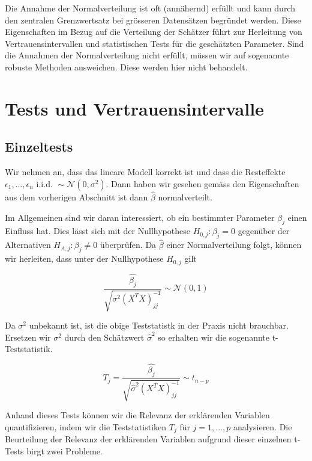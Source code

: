 \documentclass[]{book}
\begin{document}
Die Annahme der Normalverteilung ist oft (annähernd) erfüllt und kann
durch den zentralen Grenzwertsatz bei grösseren Datensätzen begründet
werden. Diese Eigenschaften im Bezug auf die Verteilung der Schätzer
führt zur Herleitung von Vertrauensintervallen und statistischen Tests
für die geschätzten Parameter. Sind die Annahmen der Normalverteilung
nicht erfüllt, müssen wir auf sogenannte robuste Methoden ausweichen.
Diese werden hier nicht behandelt.

\section{Tests und
Vertrauensintervalle}\label{tests-und-vertrauensintervalle}

\subsection{Einzeltests}\label{einzeltests}

Wir nehmen an, dass das lineare Modell korrekt ist und dass die
Resteffekte
\(\epsilon_1, \ldots, \epsilon_n \text{ i.i.d. } \sim \mathcal{N}\left(0, \sigma^2 \right)\).
Dann haben wir gesehen gemäss den Eigenschaften aus dem vorherigen
Abschnitt ist dann \(\hat{\beta}\) normalverteilt.

Im Allgemeinen sind wir daran interessiert, ob ein bestimmter Parameter
\(\beta_j\) einen Einfluss hat. Dies lässt sich mit der Nullhypothese
\(H_{0,j}: \beta_j = 0\) gegenüber der Alternativen
\(H_{A,j}: \beta_j \ne 0\) überprüfen. Da \(\hat{\beta}\) einer
Normalverteilung folgt, können wir herleiten, dass unter der
Nullhypothese \(H_{0,j}\) gilt

\begin{equation}\frac{\hat{\beta_j}}{\sqrt{\sigma^2(X^TX)_{jj}^{-1}}} \sim \mathcal{N}(0,1)\end{equation}

Da \(\sigma^2\) unbekannt ist, ist die obige Teststatistk in der Praxis
nicht brauchbar. Ersetzen wir \(\sigma^2\) durch den Schätzwert
\(\hat{\sigma}^2\) so erhalten wir die sogenannte t-Teststatistik.

\begin{equation}T_j = \frac{\hat{\beta_j}}{\sqrt{\hat{\sigma}^2(X^TX)_{jj}^{-1}}} \sim t_{n-p}\end{equation}

Anhand dieses Tests können wir die Relevanz der erklärenden Variablen
quantifizieren, indem wir die Teststatistiken \(T_j\) für
\(j=1,\ldots,p\) analysieren. Die Beurteilung der Relevanz der
erklärenden Variablen aufgrund dieser einzelnen t-Tests birgt zwei
Probleme.
\end{document}
